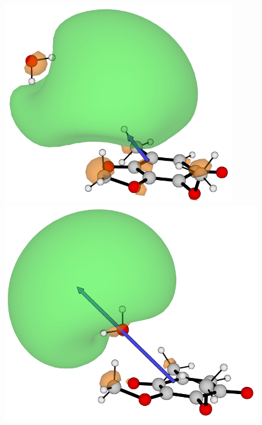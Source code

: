 \begin{figure}[h]
  \centering
    \begin{minipage}[b]{0.3\textwidth}
    \centering
      \includegraphics[width=0.9\textwidth]{chapters/results/image/Q0_H2O_H.png}
  \end{minipage}
  \hfill
  \begin{minipage}[b]{0.3\textwidth}
    \centering
    \includegraphics[width=1\textwidth]{chapters/results/image/Q0_H2O_O.png}

\end{minipage}
\end{figure}
